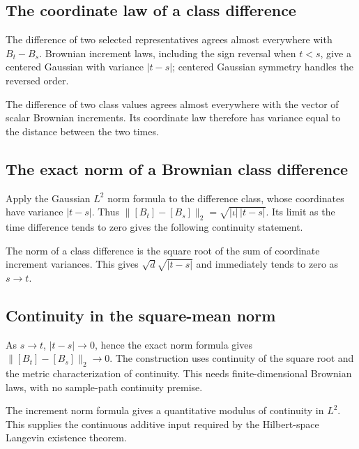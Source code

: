 \documentclass[11pt,a4paper]{article}
\begin{document}
\subsection{\texorpdfstring{The coordinate law of a class difference}{The coordinate law of a class difference}}


The difference of two selected representatives agrees almost everywhere with \(B_t-B_s\). Brownian increment laws, including the sign reversal when \(t<s\), give a centered Gaussian with variance \(|t-s|\); centered Gaussian symmetry handles the reversed order.



The difference of two class values agrees almost everywhere with the vector of scalar Brownian increments. Its coordinate law therefore has variance equal to the distance between the two times.


\subsection{\texorpdfstring{The exact norm of a Brownian class difference}{The exact norm of a Brownian class difference}}


Apply the Gaussian \(L^2\) norm formula to the difference class, whose coordinates have variance \(|t-s|\). Thus \(\|[B_t]-[B_s]\|_2=\sqrt{|\iota|\,|t-s|}\). Its limit as the time difference tends to zero gives the following continuity statement.



The norm of a class difference is the square root of the sum of coordinate increment variances. This gives \(\sqrt d\sqrt{|t-s|}\) and immediately tends to zero as \(s\to t\).


\subsection{\texorpdfstring{Continuity in the square-mean norm}{Continuity in the square-mean norm}}


As \(s\to t\), \(|t-s|\to0\), hence the exact norm formula gives \(\|[B_t]-[B_s]\|_2\to0\). The construction uses continuity of the square root and the metric characterization of continuity. This needs finite-dimensional Brownian laws, with no sample-path continuity premise.



The increment norm formula gives a quantitative modulus of continuity in \(L^2\). This supplies the continuous additive input required by the Hilbert-space Langevin existence theorem.
\end{document}
